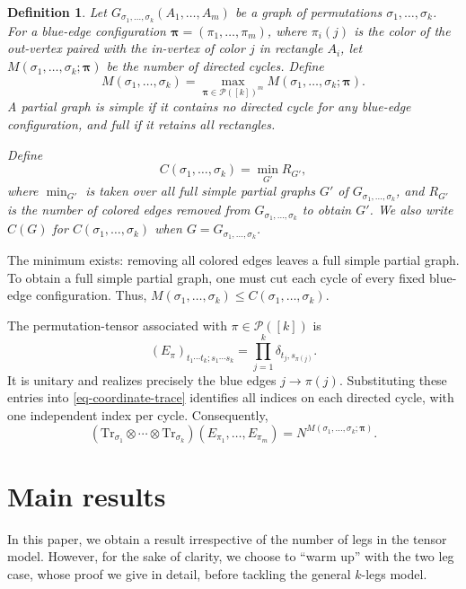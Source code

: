\documentclass[10pt,a4paper]{amsart}
\numberwithin{equation}{section}
\theoremstyle{plain}
\newtheorem{definition}[theorem]{Definition}
\def\cP{\mathcal P}
\def\Tr{\mathrm {Tr}}
\begin{document}
\begin{definition}\label{def-cycle-cut}
Let $G_{\sigma_1,\ldots,\sigma_k}(A_1,\ldots,A_m)$ be a graph of permutations $\sigma_1,\ldots,\sigma_k$.
For a blue-edge configuration $\boldsymbol\pi=(\pi_1,\ldots,\pi_m)$, where $\pi_i(j)$ is the color of the out-vertex paired with the in-vertex of color $j$ in rectangle $A_i$, let $M(\sigma_1,\ldots,\sigma_k;\boldsymbol\pi)$ be the number of directed cycles.
Define
\[
M(\sigma_1,\ldots,\sigma_k)=\max_{\boldsymbol\pi\in\cP([k])^m}M(\sigma_1,\ldots,\sigma_k;\boldsymbol\pi).
\]
A partial graph is \emph{simple} if it contains no directed cycle for any blue-edge configuration, and \emph{full} if it retains all rectangles.

Define
\[
C(\sigma_1,\ldots,\sigma_k)=\min_{G'} R_{G'},
\]
where $\min_{G'}$ is taken over all full simple partial graphs $G'$ of $G_{\sigma_1,\ldots,\sigma_k}$, and $R_{G'}$ is the number of colored edges removed from $G_{\sigma_1,\ldots,\sigma_k}$ to obtain $G'$. We also write $C(G)$ for $C(\sigma_1,\ldots,\sigma_k)$ when $G=G_{\sigma_1,\ldots,\sigma_k}$.
\end{definition}
The minimum exists: removing all colored edges leaves a full simple partial graph. To obtain a full simple partial graph, one must cut each cycle of every fixed blue-edge configuration. Thus, $M(\sigma_1,\ldots,\sigma_k)\le C(\sigma_1,\ldots,\sigma_k)$.

The permutation-tensor associated with $\pi\in\cP([k])$ is
\begin{equation}\label{eq-permutation-tensor}
(E_\pi)_{t_1\cdots t_k;s_1\cdots s_k}
=\prod_{j=1}^k\delta_{t_j,s_{\pi(j)}}.
\end{equation}
It is unitary and realizes precisely the blue edges $j\to\pi(j)$. Substituting these entries into \eqref{eq-coordinate-trace} identifies all indices on each directed cycle, with one independent index per cycle. Consequently,
\begin{equation}\label{eq-coordinate-cycles}
(\Tr_{\sigma_1}\otimes\cdots\otimes\Tr_{\sigma_k})(E_{\pi_1},\ldots,E_{\pi_m})
=N^{M(\sigma_1,\ldots,\sigma_k;\boldsymbol\pi)}.
\end{equation}

\section{Main results} \label{sec:results}

In this paper, we obtain a result irrespective of the number of legs in the tensor model. However, for the sake of clarity, we choose to ``warm up'' with the two leg case, whose proof we give in detail, before tackling the general $k$-legs model.
\end{document}
